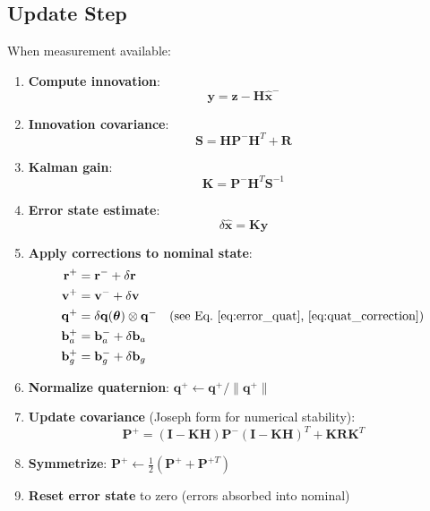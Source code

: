 \documentclass[11pt,a4paper]{article}
\newcommand{\mat}[1]{\mathbf{#1}}
\newcommand{\vect}[1]{\boldsymbol{#1}}
\newcommand{\quat}[1]{\mathbf{#1}}
\begin{document}
\subsection{Update Step}

When measurement available:

\begin{enumerate}
    \item \textbf{Compute innovation}:
    \begin{equation}
        \mat{y} = \mat{z} - \mat{H}\hat{\mat{x}}^-
    \end{equation}
    
    \item \textbf{Innovation covariance}:
    \begin{equation}
        \mat{S} = \mat{H}\mat{P}^-\mat{H}^T + \mat{R}
    \end{equation}
    
    \item \textbf{Kalman gain}:
    \begin{equation}
        \mat{K} = \mat{P}^-\mat{H}^T\mat{S}^{-1}
    \end{equation}
    
    \item \textbf{Error state estimate}:
    \begin{equation}
        \delta\hat{\mat{x}} = \mat{K}\mat{y}
    \end{equation}
    
    \item \textbf{Apply corrections to nominal state}:
    \begin{align}
        \mat{r}^+ &= \mat{r}^- + \delta\mat{r} \\
        \mat{v}^+ &= \mat{v}^- + \delta\mat{v} \\
        \quat{q}^+ &= \delta\quat{q}(\vect{\theta}) \otimes \quat{q}^- \quad \text{(see Eq.~\ref{eq:error_quat}, \ref{eq:quat_correction})} \\
        \mat{b}_a^+ &= \mat{b}_a^- + \delta\mat{b}_a \\
        \mat{b}_g^+ &= \mat{b}_g^- + \delta\mat{b}_g
    \end{align}
    
    \item \textbf{Normalize quaternion}: $\quat{q}^+ \leftarrow \quat{q}^+ / \|\quat{q}^+\|$
    
    \item \textbf{Update covariance} (Joseph form for numerical stability):
    \begin{equation}
        \mat{P}^+ = (\mat{I} - \mat{K}\mat{H})\mat{P}^-(\mat{I} - \mat{K}\mat{H})^T + \mat{K}\mat{R}\mat{K}^T
    \end{equation}
    
    \item \textbf{Symmetrize}: $\mat{P}^+ \leftarrow \frac{1}{2}(\mat{P}^+ + \mat{P}^{+T})$
    
    \item \textbf{Reset error state} to zero (errors absorbed into nominal)
\end{enumerate}
\end{document}
